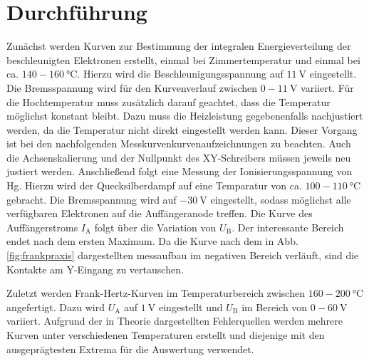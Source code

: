 
\section{Durchführung}
\label{sec:Durchführung}
Zunächst werden Kurven zur Bestimmung der integralen Energieverteilung der
beschleunigten Elektronen erstellt, einmal bei Zimmertemperatur und einmal bei
ca. $140- \SI{160}{\degreeCelsius}$. Hierzu wird die Beschleunigungsspannung auf
$\SI{11}{\volt}$ eingestellt. Die Bremsspannung wird für den Kurvenverlauf
zwischen $0 - \SI{11}{\volt}$ variiert. Für die Hochtemperatur muss zusätzlich
darauf geachtet, dass die Temperatur möglichst konstant bleibt. Dazu muss die
Heizleistung gegebenenfalls nachjustiert werden, da die Temperatur nicht direkt
eingestellt werden kann. Dieser Vorgang ist bei den nachfolgenden Messkurvenkurvenaufzeichnungen zu beachten.
Auch die Achsenskalierung und der Nullpunkt des XY-Schreibers müssen jeweils neu justiert werden.
Anschließend folgt eine Messung der Ionisierungsspannung von Hg. Hierzu wird der
Quecksilberdampf auf eine Temparatur von ca. $100- \SI{110}{\degreeCelsius}$ gebracht.
Die Bremsspannung wird auf $\SI{-30}{\volt}$ eingestellt, sodass möglichst alle
verfügbaren Elektronen auf die Auffängeranode treffen. Die Kurve des Auffängerstroms
$I_\text{A}$ folgt über die Variation von $U_\text{B}$. Der interessante Bereich endet
nach dem ersten Maximum. Da die Kurve nach dem in Abb. \ref{fig:frankpraxis}
dargestellten messaufbau im negativen Bereich verläuft, sind die
Kontakte am Y-Eingang zu vertauschen.

Zuletzt werden Frank-Hertz-Kurven im Temperaturbereich zwischen $160-\SI{200}{\degreeCelsius}$
angefertigt. Dazu wird $U_\text{A}$ auf $\SI{1}{\volt}$ eingestellt und $U_\text{B}$
im Bereich von $0-\SI{60}{\volt}$ variiert. Aufgrund der in Theorie dargestellten
Fehlerquellen werden mehrere Kurven unter verschiedenen Temperaturen erstellt und
diejenige mit den ausgeprägtesten Extrema für die Auswertung verwendet.
